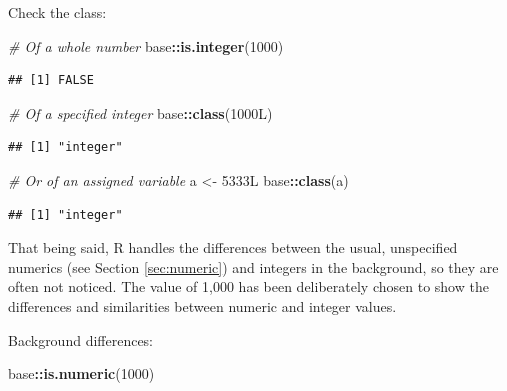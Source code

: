 \documentclass[
]{book}
\newenvironment{Shaded}{\begin{snugshade}}{\end{snugshade}}
\newcommand{\CommentTok}[1]{\textcolor[rgb]{0.56,0.35,0.01}{\textit{#1}}}
\newcommand{\DataTypeTok}[1]{\textcolor[rgb]{0.13,0.29,0.53}{#1}}
\newcommand{\DecValTok}[1]{\textcolor[rgb]{0.00,0.00,0.81}{#1}}
\newcommand{\FunctionTok}[1]{\textcolor[rgb]{0.13,0.29,0.53}{\textbf{#1}}}
\newcommand{\NormalTok}[1]{#1}
\newcommand{\OtherTok}[1]{\textcolor[rgb]{0.56,0.35,0.01}{#1}}
\newcommand{\SpecialCharTok}[1]{\textcolor[rgb]{0.81,0.36,0.00}{\textbf{#1}}}
\begin{document}
Check the class:

\begin{Shaded}
\begin{Highlighting}[]
\CommentTok{\# Of a whole number}
\NormalTok{base}\SpecialCharTok{::}\FunctionTok{is.integer}\NormalTok{(}\DecValTok{1000}\NormalTok{)}
\end{Highlighting}
\end{Shaded}

\begin{verbatim}
## [1] FALSE
\end{verbatim}

\begin{Shaded}
\begin{Highlighting}[]
\CommentTok{\# Of a specified integer}
\NormalTok{base}\SpecialCharTok{::}\FunctionTok{class}\NormalTok{(}\DecValTok{1000}\DataTypeTok{L}\NormalTok{)}
\end{Highlighting}
\end{Shaded}

\begin{verbatim}
## [1] "integer"
\end{verbatim}

\begin{Shaded}
\begin{Highlighting}[]
\CommentTok{\# Or of an assigned variable}
\NormalTok{a }\OtherTok{\textless{}{-}} \DecValTok{5333}\DataTypeTok{L}
\NormalTok{base}\SpecialCharTok{::}\FunctionTok{class}\NormalTok{(a)}
\end{Highlighting}
\end{Shaded}

\begin{verbatim}
## [1] "integer"
\end{verbatim}

That being said, R handles the differences between the usual, unspecified numerics (see Section \ref{sec:numeric}) and integers in the background, so they are often not noticed. The value of 1,000 has been deliberately chosen to show the differences and similarities between numeric and integer values.

Background differences:

\begin{Shaded}
\begin{Highlighting}[]
\NormalTok{base}\SpecialCharTok{::}\FunctionTok{is.numeric}\NormalTok{(}\DecValTok{1000}\NormalTok{)}
\end{Highlighting}
\end{Shaded}
\end{document}

